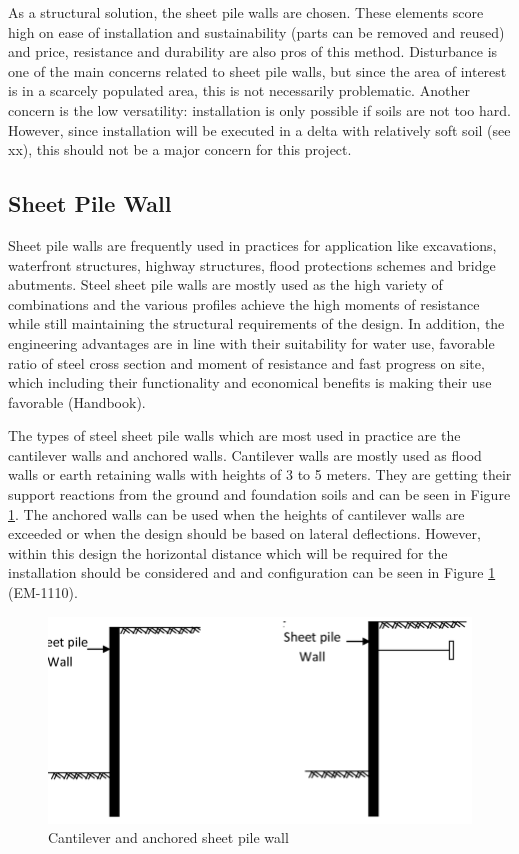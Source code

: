 As a structural solution, the sheet pile walls are chosen. These elements score high on ease of installation and sustainability (parts can be removed and reused) and price, resistance and durability are also pros of this method. Disturbance is one of the main concerns related to sheet pile walls, but since the area of interest is in a scarcely populated area, this is not necessarily problematic. Another concern is the low versatility: installation is only possible if soils are not too hard. However, since installation will be executed in a delta with relatively soft soil (see xx), this should not be a major concern for this project.

\subsection{Sheet Pile Wall}

Sheet pile walls are frequently used in practices for application like excavations, waterfront structures, highway structures, flood protections schemes and bridge abutments. Steel sheet pile walls are mostly used as the high variety of combinations and the various profiles achieve the high moments of resistance while still maintaining the structural requirements of the design. In addition, the engineering advantages are in line with their suitability for water use, favorable ratio of steel cross section and moment of resistance and fast progress on site, which including their functionality and economical benefits is making their use favorable (Handbook).

The types of steel sheet pile walls which are most used in practice are the cantilever walls and anchored walls. Cantilever walls are mostly used as flood walls or earth retaining walls with heights of 3 to 5 meters. They are getting their support reactions from the ground and foundation soils and can be seen in Figure \ref{fig:sheetpiles}. The anchored walls can be used when the heights of cantilever walls are exceeded or when the design should be based on lateral deflections. However, within this design the horizontal distance which will be required for the installation should be considered and and configuration can be seen in Figure \ref{fig:sheetpiles} (EM-1110).

\begin{figure}[H]
    \centering
    \includegraphics[width=0.50\linewidth]{figures/ch8/Anchored-Sheet-pile-wall.png}
    \caption{Cantilever and anchored sheet pile wall}
    \label{fig:sheetpiles}
\end{figure}

